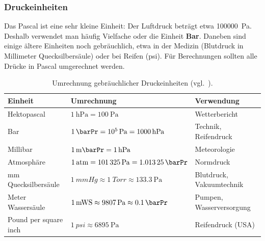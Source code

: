 \subsubsection*{Druckeinheiten}
Das Pascal ist eine sehr kleine Einheit: Der Luftdruck beträgt etwa \SI{100000}{\pascal}. Deshalb verwendet man häufig Vielfache oder die Einheit \textbf{Bar}. Daneben sind einige ältere Einheiten noch gebräuchlich, etwa in der Medizin (Blutdruck in Millimeter Quecksilbersäule) oder bei Reifen (psi). Für Berechnungen sollten alle Drücke in Pascal umgerechnet werden.

\begin{table}[htb]
    \centering
    \caption{Umrechnung gebräuchlicher Druckeinheiten (vgl.~\cite[S.~456]{Giancoli2010}).}\label{tab: druckeinheiten}
    \vspace{4pt}
    \small
    \begin{tabular}{l l l}
        \toprule
        \textbf{Einheit} & \textbf{Umrechnung} & \textbf{Verwendung} \\
        \midrule
        Hektopascal & $\SI{1}{\hecto\pascal} = \SI{100}{\pascal}$ & Wetterbericht \\
        Bar & $\SI{1}{\barPr} = \SI{e5}{\pascal} = \SI{1000}{\hecto\pascal}$ & Technik, Reifendruck \\
        Millibar & $\SI{1}{\milli\barPr} = \SI{1}{\hecto\pascal}$ & Meteorologie \\
        Atmosphäre &$\SI{1}{atm} = \SI{101325}{\pascal} = \SI{1.01325}{\barPr}$ & Normdruck \\
        mm Quecksilbersäule &$\SI{1}{mmHg} \approx \SI{1}{Torr} \approx \SI{133.3}{\pascal}$ & Blutdruck, Vakuumtechnik \\
        Meter Wassersäule & $\SI{1}{mWS} \approx \SI{9807}{\pascal} \approx \SI{0.1}{\barPr}$ & Pumpen, Wasserversorgung \\
        Pound per square inch & $\SI{1}{psi} \approx \SI{6895}{\pascal}$ & Reifendruck (USA) \\
        \bottomrule
    \end{tabular}
\end{table}

